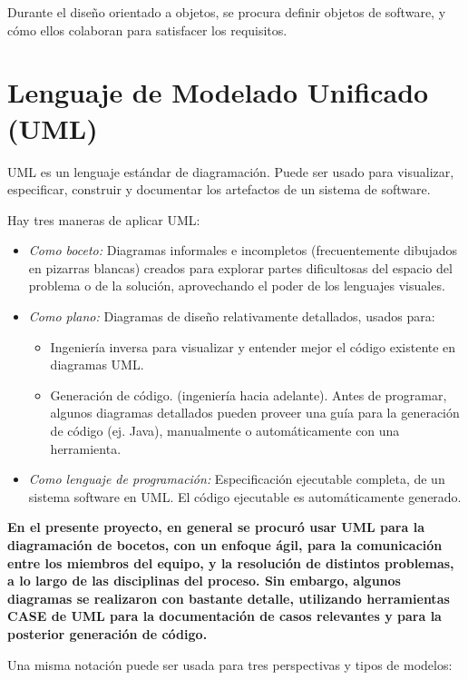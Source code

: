 Durante el diseño orientado a objetos, se procura definir objetos de software, y cómo ellos colaboran para satisfacer los requisitos.

\section{Lenguaje de Modelado Unificado (UML)}

UML es un lenguaje estándar de diagramación. Puede ser usado para visualizar, especificar, construir y documentar los artefactos de un sistema de software.

Hay tres maneras de aplicar UML:

\begin{itemize}
    \item \emph{Como boceto:} Diagramas  informales e incompletos (frecuentemente dibujados en pizarras blancas) creados para explorar partes dificultosas del espacio del problema o de la solución, aprovechando el poder de los lenguajes visuales.
    \item \emph{Como plano:} Diagramas de diseño relativamente detallados, usados para:
        \begin{itemize}
            \item Ingeniería inversa para visualizar y entender mejor el código existente en diagramas UML.
            \item Generación de código. (ingeniería hacia adelante). Antes de programar, algunos diagramas detallados pueden proveer una guía para la generación de código (ej. Java), manualmente o automáticamente con una herramienta. 
        \end{itemize}
    \item \emph{Como lenguaje de programación:} Especificación ejecutable completa, de un sistema software en UML. El código ejecutable es automáticamente generado.
\end{itemize}

\textbf{En el presente proyecto, en general se procuró usar UML para la diagramación de bocetos, con un enfoque ágil, para la comunicación entre los miembros del equipo, y la resolución de distintos problemas, a lo largo de las disciplinas del proceso.
Sin embargo, algunos diagramas se realizaron con bastante detalle, utilizando herramientas CASE de UML  para la documentación de casos relevantes y para la posterior generación de código.}

Una misma notación puede ser usada para tres perspectivas y tipos de modelos:

